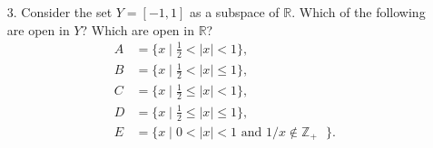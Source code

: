 \documentclass[12pt]{article}
\theoremstyle{definition}
\newcommand{\abs}[1]{\lvert #1 \rvert}
\begin{document}
\begin{enumerate}
\begin{enumerate}
\begin{proof}
                        a basis for $\mathcal{T}_2$.
                    \end{proof}
                \item Show that the collection 
                    \begin{equation*}
                        \mathcal{C}=\{[a, b)\mid a<b, \text{ $a$ and $b$
                        rational }\} 
                    \end{equation*}
                is a basis that generates a topology different from the lower
                limit topology on $\mathbb{R}$.
                    \begin{proof}
                        We want to show that $\mathcal{C}\neq\mathbb{R}_{l}$,
                        where $\mathbb{R}_l$ is the lower limit topology on
                        $\mathbb{R}$. To prove this we select the set
                        $[\sqrt{2}, 3)\in\mathbb{R}_l$ and let $x=\sqrt{2} $. From here we appeal to
                        the negation of Lemma 13.2. Namely, to show that there
                        does not exist a $B\in\mathcal{C}$ such that $x\in
                        B\subset[\sqrt{2}, 3 )$. This follows from
                        $x=\sqrt{2}$,
                        and so for all $[a, b)\subset[\sqrt{2}, 3)$ such that
                        $x\in[a, b)$ it implies $a=\sqrt{2}$ and thus $[a,
                        b)\not\subset\mathcal{C}$.
                    \end{proof}
            \end{enumerate}
        \item[3.] Consider the set $Y=[-1, 1]$ as a subspace of $\mathbb{R}$.
            Which of the following are open in $Y$? Which are open in
            $\mathbb{R}$?
                \begin{equation*}
                    \begin{split}
                        A &= \{x\mid \frac{1}{2}<\abs{x}<1\}, \\
                        B &= \{x\mid \frac{1}{2}<\abs{x}\leq 1\}, \\
                        C &= \{x\mid \frac{1}{2}\leq\abs{x}<1\}, \\
                        D &= \{x\mid\frac{1}{2}\leq\abs{x}\leq 1\}, \\
                        E &= \{x\mid 0<\abs{x}<1\text{ and
                        $1/x\not\in\mathbb{Z}_+$ }\}.  
                    \end{split}
                \end{equation*}

\end{enumerate}
\end{document}
